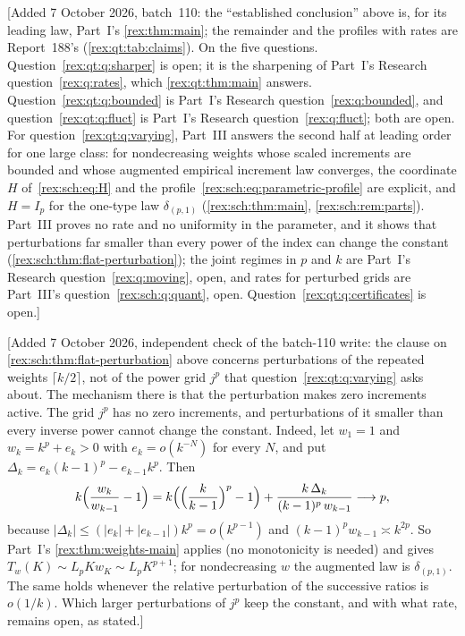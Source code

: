 [Added 7 October 2026, batch~110: the ``established conclusion'' above is,
for its leading law, Part~I's \cref{rex:thm:main}; the remainder and the
profiles with rates are Report~188's (\cref{rex:qt:tab:claims}). On the
five questions. Question~\ref{rex:qt:q:sharper} is open; it is the
sharpening of Part~I's Research question~\ref{rex:q:rates}, which
\cref{rex:qt:thm:main} answers. Question~\ref{rex:qt:q:bounded} is Part~I's
Research question~\ref{rex:q:bounded}, and question~\ref{rex:qt:q:fluct}
is Part~I's Research question~\ref{rex:q:fluct}; both are open. For
question~\ref{rex:qt:q:varying}, Part~III answers the second half at
leading order for one large class: for nondecreasing weights whose scaled
increments are bounded and whose augmented empirical increment law
converges, the coordinate $H$ of~\eqref{rex:sch:eq:H} and the
profile~\eqref{rex:sch:eq:parametric-profile} are explicit, and $H=I_p$ for
the one-type law $\delta_{(p,1)}$ (\cref{rex:sch:thm:main},
\cref{rex:sch:rem:parts}). Part~III proves no rate and no uniformity in
the parameter, and it shows that perturbations far smaller than every
power of the index can change the constant
(\cref{rex:sch:thm:flat-perturbation}); the joint regimes in $p$ and $k$
are Part~I's Research question~\ref{rex:q:moving}, open, and rates for
perturbed grids are Part~III's question~\ref{rex:sch:q:quant}, open.
Question~\ref{rex:qt:q:certificates} is open.]

[Added 7 October 2026, independent check of the batch-110 write: the
clause on \cref{rex:sch:thm:flat-perturbation} above concerns perturbations
of the repeated weights $\lceil k/2\rceil$, not of the power grid $j^p$
that question~\ref{rex:qt:q:varying} asks about. The mechanism there is
that the perturbation makes zero increments active. The grid $j^p$ has no
zero increments, and perturbations of it smaller than every inverse power
cannot change the constant. Indeed, let $w_1=1$ and $w_k=k^p+e_k>0$ with
$e_k=o(k^{-N})$ for every $N$, and put
$\Delta_k=e_k(k-1)^p-e_{k-1}k^p$. Then
\[
 k\Bigl(\frac{w_k}{w_{k-1}}-1\Bigr)
 =k\Bigl(\Bigl(\frac{k}{k-1}\Bigr)^p-1\Bigr)
  +\frac{k\,\Delta_k}{(k-1)^p\,w_{k-1}}
 \longrightarrow p,
\]
because $|\Delta_k|\le(|e_k|+|e_{k-1}|)k^p=o(k^{p-1})$ and
$(k-1)^pw_{k-1}\asymp k^{2p}$. So Part~I's \cref{rex:thm:weights-main}
applies (no monotonicity is needed) and gives $T_w(K)\sim L_pKw_K\sim
L_pK^{p+1}$; for nondecreasing $w$ the augmented law is $\delta_{(p,1)}$.
The same holds whenever the relative perturbation of the successive ratios
is $o(1/k)$. Which larger perturbations of $j^p$ keep the constant, and
with what rate, remains open, as stated.]
